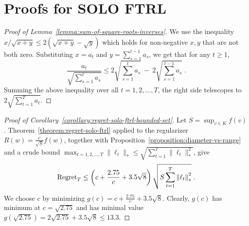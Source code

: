 \section{Proofs for \textsc{SOLO FTRL}}
\label{section:solo-ftrl-proofs}

\begin{proof}[Proof of Lemma~\ref{lemma:sum-of-square-roots-inverses}]
We use the inequality $x/\sqrt{x+y} \le 2(\sqrt{x+y} - \sqrt{y})$ which holds
for non-negative $x,y$ that are not both zero. Substituting $x = a_t$ and $y=\sum_{s=1}^{t-1} a_s$,
we get that for any $t \ge 1$,
$$
\frac{a_t}{\sqrt{\sum_{s=1}^t a_s}} \le 2 \sqrt{\sum_{s=1}^t a_s} \ - \ 2 \sqrt{\sum_{s=1}^{t-1} a_s} \; .
$$
Summing the above inequality over all $t=1,2,\dots,T$, the right side telescopes to
$2 \sqrt{\sum_{t=1}^T a_t}$.
\end{proof}

\begin{proof}[Proof of Corollary~\ref{corollary:regret-solo-ftrl-bounded-set}]
Let $S = \sup_{v \in K} f(v)$. Theorem~\ref{theorem:regret-solo-ftrl} applied
to the regularizer $R(w) = \frac{c}{\sqrt{S}} f(w)$, together with
Proposition~\ref{proposition:diameter-vs-range} and a crude bound
$\max_{t=1,2,\dots,T} \|\ell_t\|_* \le \sqrt{\sum_{t=1}^T \|\ell_t\|_*^2}$,
give
$$
\operatorname{Regret}_T \le \left(c + \frac{2.75}{c}  + 3.5\sqrt{8} \right) \sqrt{S \sum_{t=1}^{T} {\left\|{\ell_t}\right\|}_*^2} \; .
$$
We choose $c$ by minimizing $g(c) = c + \frac{2.75}{c} + 3.5\sqrt{8}$. Clearly,
$g(c)$ has minimum at $c = \sqrt{2.75}$ and has minimal value $g(\sqrt{2.75}) =
2\sqrt{2.75} + 3.5\sqrt{8} \le 13.3$.
\end{proof}
